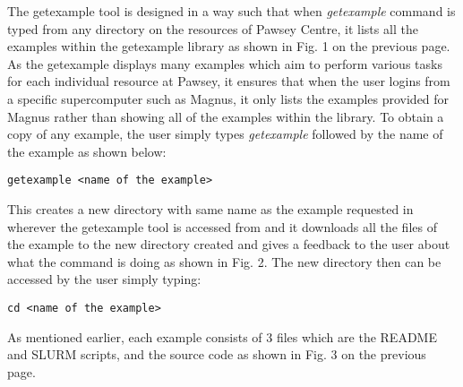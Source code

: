 The getexample tool is designed in a way such that when \emph{getexample} command is typed from any directory on the resources of Pawsey Centre, it 
lists all the examples within the getexample library as shown in Fig. 1 on the previous page. As the getexample displays many examples which aim to 
perform various tasks for each individual resource at Pawsey, it ensures that when the user logins from a specific supercomputer such as Magnus, it 
only lists the examples provided for Magnus rather than showing all of the examples within the library. To obtain a copy of any example, the user simply 
types \emph{getexample} followed by the name of the example as shown below:

\begin{tcolorbox}
\begin{Verbatim}[fontsize=\scriptsize]
getexample <name of the example>
\end{Verbatim}
\end{tcolorbox}

This creates a new directory with same name as the example requested in wherever the getexample tool is accessed from and it downloads all the files of
the example to the new directory created and gives a feedback to the user about what the command is doing as shown in Fig. 2. The new directory then can 
be accessed by the user simply typing:

\begin{tcolorbox}
\begin{Verbatim}[fontsize=\scriptsize]
cd <name of the example>
\end{Verbatim}
\end{tcolorbox}

As mentioned earlier, each example consists of 3 files which are the README and SLURM scripts, and the source code as shown in Fig. 3 on the previous
page.


